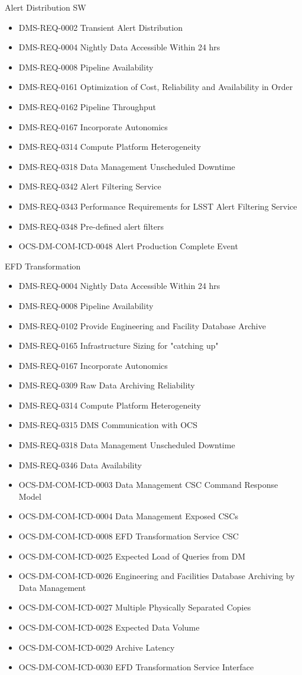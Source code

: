 Alert Distribution SW \begin{itemize}
\item DMS-REQ-0002 Transient Alert Distribution
\item DMS-REQ-0004 Nightly Data Accessible Within 24 hrs
\item DMS-REQ-0008 Pipeline Availability
\item DMS-REQ-0161 Optimization of Cost, Reliability and Availability in Order
\item DMS-REQ-0162 Pipeline Throughput
\item DMS-REQ-0167 Incorporate Autonomics
\item DMS-REQ-0314 Compute Platform Heterogeneity
\item DMS-REQ-0318 Data Management Unscheduled Downtime
\item DMS-REQ-0342 Alert Filtering Service
\item DMS-REQ-0343 Performance Requirements for LSST Alert Filtering Service
\item DMS-REQ-0348 Pre-defined alert filters
\item OCS-DM-COM-ICD-0048 Alert Production Complete Event
\end{itemize}
EFD Transformation \begin{itemize}
\item DMS-REQ-0004 Nightly Data Accessible Within 24 hrs
\item DMS-REQ-0008 Pipeline Availability
\item DMS-REQ-0102 Provide Engineering and Facility Database Archive
\item DMS-REQ-0165 Infrastructure Sizing for "catching up"
\item DMS-REQ-0167 Incorporate Autonomics
\item DMS-REQ-0309 Raw Data Archiving Reliability
\item DMS-REQ-0314 Compute Platform Heterogeneity
\item DMS-REQ-0315 DMS Communication with OCS
\item DMS-REQ-0318 Data Management Unscheduled Downtime
\item DMS-REQ-0346 Data Availability
\item OCS-DM-COM-ICD-0003 Data Management CSC Command Response Model
\item OCS-DM-COM-ICD-0004 Data Management Exposed CSCs
\item OCS-DM-COM-ICD-0008 EFD Transformation Service CSC
\item OCS-DM-COM-ICD-0025 Expected Load of Queries from DM
\item OCS-DM-COM-ICD-0026 Engineering and Facilities Database Archiving by Data Management
\item OCS-DM-COM-ICD-0027 Multiple Physically Separated Copies
\item OCS-DM-COM-ICD-0028 Expected Data Volume
\item OCS-DM-COM-ICD-0029 Archive Latency
\item OCS-DM-COM-ICD-0030 EFD Transformation Service Interface
\end{itemize}
